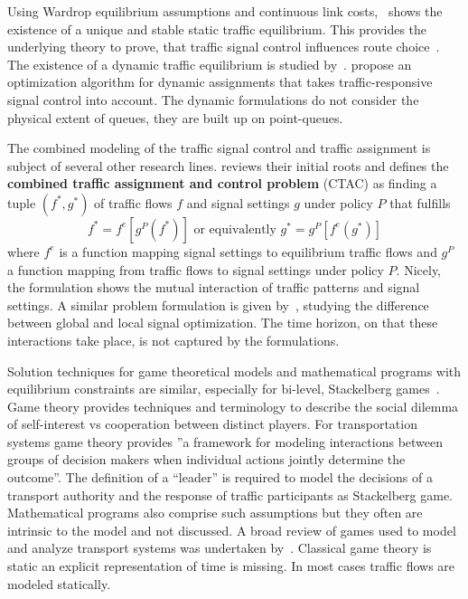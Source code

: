 Using Wardrop equilibrium assumptions and continuous link costs,~\citet{Smith1979ExistenceUniquenessStabilityEquilibria} shows the existence of a unique and stable static traffic equilibrium. 
This provides the underlying theory to prove, that traffic signal control influences route choice~\citep{Smith1979TrafficControlRouteChoice}. 
The existence of a dynamic traffic equilibrium is studied by~\citet{Smith1993ModelDynamicUE}. 
\citet{SmithVanVuren1993TrafficEquilibriumResponsiveControl} propose an optimization algorithm for dynamic assignments that takes traffic-responsive signal control into account.  
The dynamic formulations do not consider the physical extent of queues, they are built up on point-queues. 

The combined modeling of the traffic signal control and traffic assignment is subject of several other research lines. 
\citet{Meneguzzer1997ModelReviewTrafficAssignmentSignalControl} reviews their initial roots and defines the {\bf combined traffic assignment and control problem} (CTAC) as finding a tuple $(f^{*}, g^{*})$ of traffic flows $f$ and signal settings $g$ under policy $P$ that fulfills  
\[
f^{*} = f^{e}[g^{P}(f^{*})] \mbox{  or  equivalently } g^{*} = g^{P}[f^{e}(g^{*})]
\]
where $f^{e}$ is a function mapping signal settings to equilibrium traffic flows and $g^{P}$ a function mapping from traffic flows to signal settings under policy $P$.  
Nicely, the formulation shows the mutual interaction of traffic patterns and signal settings. 
A similar problem formulation is given by~\citet{CascettaGalloMontella2006SignalsWithStochAssignment}, studying the difference between global and local signal optimization. 
The time horizon, on that these interactions take place, is not captured by the formulations. 

Solution techniques for game theoretical models and mathematical programs with equilibrium constraints are similar, especially for bi-level, Stackelberg games~\citep{Hollander2006NonCooperativeGamesTransport}. 
Game theory provides techniques and terminology to describe the social dilemma of self-interest vs cooperation between distinct players. 
For transportation systems game theory provides ''a framework for modeling interactions between groups of decision makers when individual actions jointly determine the outcome''\citep{Fisk1984GameTheoryTransportationSystems}. 
The definition of a ``leader'' is required to model the decisions of a transport authority and the response of traffic participants as Stackelberg game. 
%
Mathematical programs also comprise such assumptions but they often are intrinsic to the model and not discussed. 
%
A broad review of games used to model and analyze transport systems was undertaken by~\citet{Hollander2006NonCooperativeGamesTransport}. 
Classical game theory is static an explicit representation of time is missing. 
In most cases traffic flows are modeled statically. 

